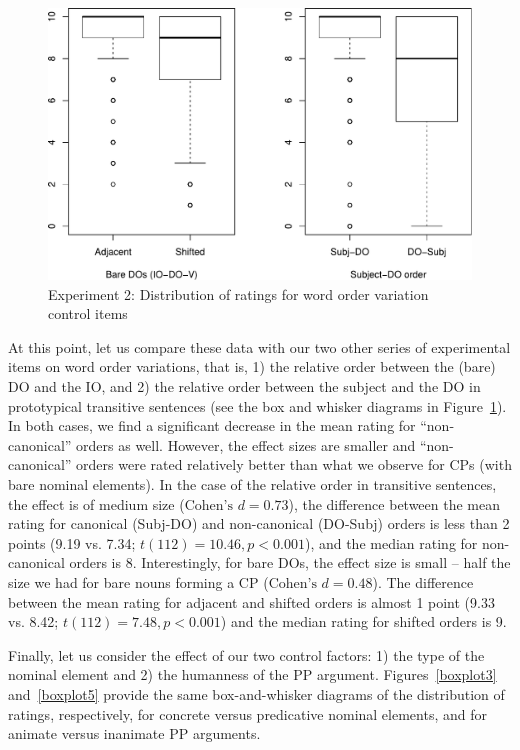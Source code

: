 \documentclass[output=paper]{langsci/langscibook}
\begin{document}
\begin{figure}
    \includegraphics[width=1\linewidth]{plots/Rplot07.pdf}
	\caption{Experiment 2: Distribution of ratings for word order variation control items}\label{boxplot4}
\end{figure}


At this point, let us compare these data with our two other series of experimental items on word order variations, that is, 1) the relative order between the (bare) DO and the IO, and 2) the relative order between the subject and the DO in prototypical transitive sentences (see the box and whisker diagrams in Figure~\ref{boxplot4}). In both cases, we find a significant decrease in the mean rating for ``non-canonical'' orders as well. However, the effect sizes are smaller and ``non-canonical'' orders were rated relatively better than what we observe for CPs (with bare nominal elements).  
In the case of the relative order in transitive sentences, the effect is of medium size ($\text{Cohen's } d=0.73$), the difference between the mean rating for canonical (Subj-DO) and non-canonical (DO-Subj) orders is less than 2 points (9.19 vs. 7.34; $t(112)= 10.46, p<0.001$), and the median rating for non-canonical orders is 8. 
Interestingly, for bare DOs, the effect size is small -- half the size we had for bare nouns forming a CP ($\text{Cohen's } d=0.48$). The difference between the mean rating  for adjacent and shifted orders is almost 1 point (9.33 vs. 8.42; $t(112)= 7.48, p<0.001$) and the median rating for shifted orders is 9. 


Finally, let us consider the effect of our two control factors: 1) the type of the nominal element and 2) the humanness of the PP argument. Figures~\ref{boxplot3} and~\ref{boxplot5} provide the same box-and-whisker diagrams of the distribution of ratings, respectively, for concrete versus predicative nominal elements, and for animate versus inanimate PP arguments. 
\end{document}
